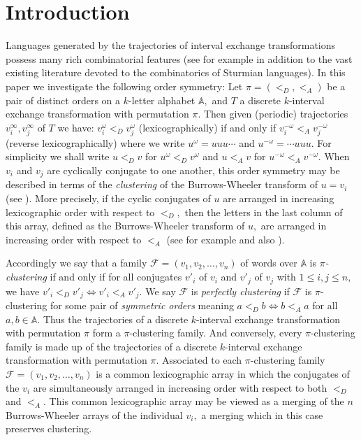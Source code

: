 \documentclass[12pt,a4paper]{amsart}
\newcommand{\A}{{\mathbb A}}
\begin{document}
\section{Introduction}





Languages generated by the  trajectories of interval exchange transformations possess many rich combinatorial features (see for example \cite{DoHu,fz4,fz5,fz6,fhuz,lap,lapplou,lapreut,mrs} in addition to the vast existing literature devoted to the combinatorics of Sturmian languages). 
In this paper we investigate the following order symmetry: Let $\pi=(<_D,<_A)$ be a pair of distinct orders on a $k$-letter alphabet $\A,$  and $T$ a discrete $k$-interval exchange transformation with permutation $\pi.$ Then given  (periodic) trajectories $v_i^\infty,v_j^\infty$ of $T$ we have:   $v_i^\omega <_D v_j^\omega$ (lexicographically) if and only if $v_i^{-\omega}<_Av_j^{-\omega}$ (reverse lexicographically) where we write $u^\omega=uuu\cdots$ and $u^{-\omega}=\cdots uuu.$   
For simplicity we shall write $u<_D v$ for $u^\omega <_D v^\omega$ and $u<_A v$ for $u^{-\omega}<_A v^{-\omega}.$ 
When $v_i$ and $v_j$ are cyclically conjugate to one another, this order symmetry may be described in terms of the {\it clustering} of the Burrows-Wheeler transform of $u=v_i$ (see \cite{bw}). More precisely,   if the cyclic conjugates of $u$ are arranged in increasing lexicographic order with respect to $<_D,$ then the letters in the last column of this array, defined as the Burrows-Wheeler transform of $u,$ are arranged in increasing order with respect to $<_A$  (see for example \cite{fz4, lap, mrs} and also \cite{GR}). 


Accordingly we say that a family $\mathcal F=(v_1,v_2,\ldots ,v_n)$  of words over $\A$ is {\it $\pi$-clustering} if and only if for all conjugates $v'_i$ of $v_i$ and $v'_j$ of $v_j$ with $1\leq i,j\leq n,$ we have $v'_i<_D v'_j\Leftrightarrow v'_i<_A v'_j.$ 
We say $\mathcal F$ is {\it perfectly clustering} if $\mathcal F$ is $\pi$-clustering for some pair of {\it symmetric orders }  meaning $a<_D b \Leftrightarrow b<_A a$ for all  $a,b\in \A.$
Thus the  trajectories of a discrete $k$-interval exchange transformation with permutation $\pi$ form a $\pi$-clustering family. And conversely,  every $\pi$-clustering family is made up of the trajectories of a discrete $k$-interval exchange transformation with permutation $\pi.$ Associated to each $\pi$-clustering family  $\mathcal F=(v_1,v_2,\ldots ,v_n)$  is a common lexicographic array in which the conjugates of the $v_i$ are simultaneously arranged in increasing order with respect to both $<_D$ and $<_A.$ This common lexicographic array may be viewed as a merging of the $n$ Burrows-Wheeler arrays of the individual $v_i,$ a merging which in this case preserves clustering. 
\end{document}
